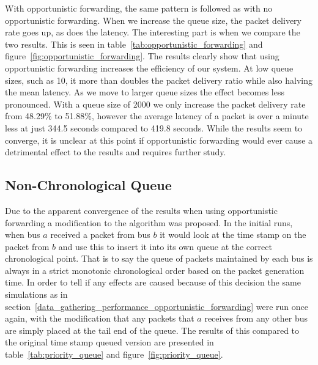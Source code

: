         With opportunistic forwarding, the same pattern is followed as with no opportunistic forwarding. When we increase the queue size, the packet delivery rate goes up, as does the latency. The interesting part is when we compare the two results. This is seen in table~\ref{tab:opportunistic_forwarding} and figure~\ref{fig:opportunistic_forwarding}. The results clearly show that using opportunistic forwarding increases the efficiency of our system. At low queue sizes, such as 10, it more than doubles the packet delivery ratio while also halving the mean latency. As we move to larger queue sizes the effect becomes less pronounced. With a queue size of 2000 we only increase the packet delivery rate from 48.29\% to 51.88\%, however the average latency of a packet is over a minute less at just 344.5 seconds compared to 419.8 seconds. While the results seem to converge, it is unclear at this point if opportunistic forwarding would ever cause a detrimental effect to the results and requires further study.


    \subsection{Non-Chronological Queue}\label{data_gathering_performance_non-chronological_queue}

        Due to the apparent convergence of the results when using opportunistic forwarding a modification to the algorithm was proposed. In the initial runs, when bus $a$ received a packet from bus $b$ it would look at the time stamp on the packet from $b$ and use this to insert it into its own queue at the correct chronological point. That is to say the queue of packets maintained by each bus is always in a strict monotonic chronological order based on the packet generation time. In order to tell if any effects are caused because of this decision the same simulations as in section~\ref{data_gathering_performance_opportunistic_forwarding} were run once again, with the modification that any packets that $a$ receives from any other bus are simply placed at the tail end of the queue. The results of this compared to the original time stamp queued version are presented in table~\ref{tab:priority_queue} and figure~\ref{fig:priority_queue}.

